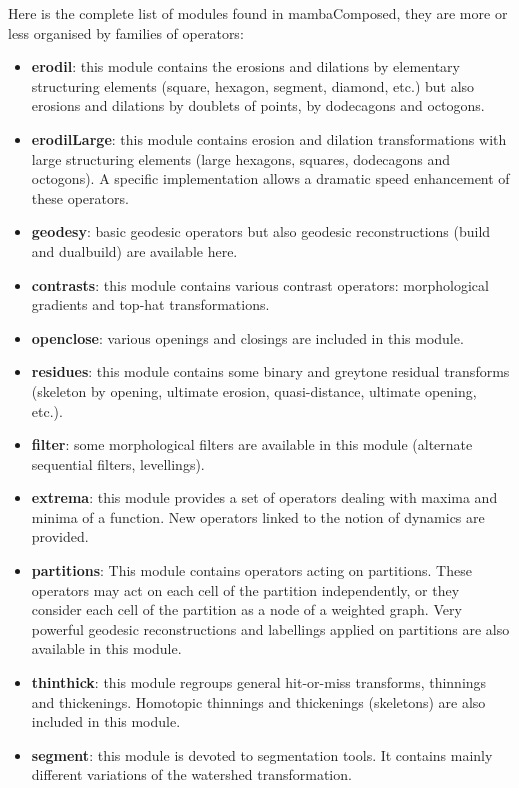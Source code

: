 \documentclass[a4paper,10pt,oneside]{article}
\begin{document}
Here is the complete list of modules found in mambaComposed, they are more or less
organised by families of operators:

\begin{itemize}
\item \textbf{erodil}: this module contains the erosions and dilations by elementary 
structuring elements (square, hexagon, segment, diamond, etc.) but also erosions 
and dilations by doublets of points, by dodecagons and octogons.
\item \textbf{erodilLarge}: this module contains erosion and dilation transformations 
with large structuring elements (large hexagons, squares, dodecagons and octogons). 
A specific implementation allows a dramatic speed enhancement of these operators.
\item \textbf{geodesy}: basic geodesic operators but also geodesic reconstructions 
(build and dualbuild) are available here.
\item \textbf{contrasts}: this module contains various contrast operators: morphological 
gradients and top-hat transformations.
\item \textbf{openclose}: various openings and closings are included in this module.
\item \textbf{residues}: this module contains some binary and greytone residual 
transforms (skeleton by opening, ultimate erosion, quasi-distance, ultimate opening,
etc.).
\item \textbf{filter}: some morphological filters are available in this module 
(alternate sequential filters, levellings).
\item \textbf{extrema}: this module provides a set of operators dealing with maxima and
minima of a function. New operators linked to the notion of dynamics are provided.
\item \textbf{partitions}: This module contains operators acting on partitions. These
operators may act on each cell of the partition independently, or they consider each cell
of the partition as a node of a weighted graph. Very powerful geodesic reconstructions and
labellings applied on partitions are also available in this module. 
\item \textbf{thinthick}: this module regroups general hit-or-miss transforms, thinnings 
and thickenings. Homotopic thinnings and thickenings (skeletons) are also included 
in this module.
\item \textbf{segment}: this module is devoted to segmentation tools. It contains 
mainly different variations of the watershed transformation.

\end{itemize}
\end{document}
